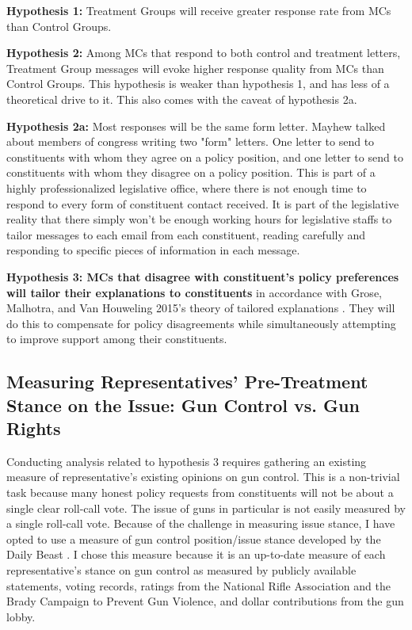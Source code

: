 \documentclass[12pt]{article}\usepackage[]{graphicx}\usepackage[]{color}
\begin{document}
\textbf{Hypothesis 1: }Treatment Groups will receive greater response rate from MCs than Control Groups.

\textbf{Hypothesis 2: }Among MCs that respond to both control and treatment letters, Treatment Group messages will evoke higher response quality from MCs than Control Groups. This hypothesis is weaker than hypothesis 1, and has less of a theoretical drive to it. This also comes with the caveat of hypothesis 2a. 

\textbf{Hypothesis 2a: } Most responses will be the same form letter. Mayhew talked about members of congress writing two "form" letters. One letter to send to constituents with whom they agree on a policy position, and one letter to send to constituents with whom they disagree on a policy position. This is part of a highly professionalized legislative office, where there is not enough time to respond to every form of constituent contact received. It is part of the legislative reality that there simply won't be enough working hours for legislative staffs to tailor messages to each email from each constituent, reading carefully and responding to specific pieces of information in each message. 

\textbf{Hypothesis 3: MCs that disagree with constituent's policy preferences will tailor their explanations to constituents} in accordance with Grose, Malhotra, and Van Houweling 2015's theory of tailored explanations \citep{Kingdon:1989aa,Grose:2015aa,fenno1978home}. They will do this to compensate for policy disagreements while simultaneously attempting to improve support among their constituents.

\subsection{Measuring Representatives' Pre-Treatment Stance on the Issue: Gun Control vs. Gun Rights}
Conducting analysis related to hypothesis 3 requires gathering an existing measure of representative's existing opinions on gun control. This is a non-trivial task because many honest policy requests from constituents will not be about a single clear roll-call vote. The issue of guns in particular is not easily measured by a single roll-call vote. Because of the challenge in measuring issue stance, I have opted to use a measure of gun control position/issue stance developed by the Daily Beast \cite{Michael-Keller:aa}. I chose this measure because it is an up-to-date measure of each representative's stance on gun control as measured by publicly available statements, voting records, ratings from the National Rifle Association and the Brady Campaign to Prevent Gun Violence, and dollar contributions from the gun lobby.
\end{document}
